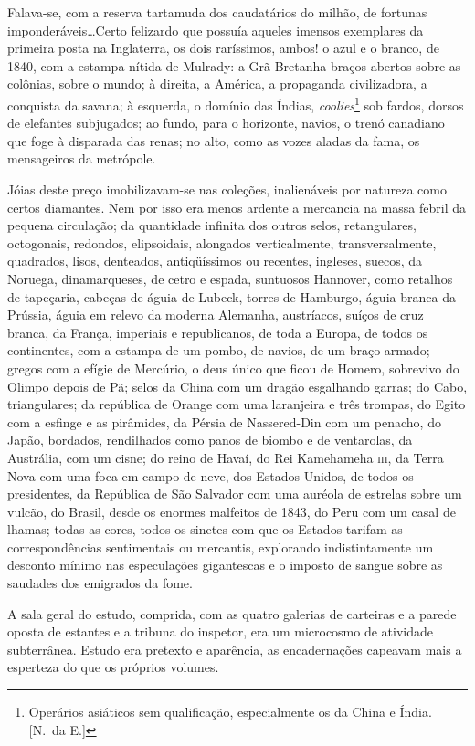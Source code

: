 Falava{}-se, com a reserva tartamuda dos caudatários do milhão, de
fortunas imponderáveis\ldots Certo felizardo que possuía aqueles imensos
exemplares da primeira posta na Inglaterra, os dois raríssimos, ambos!
o azul e o branco, de 1840, com a estampa nítida de Mulrady: a
Grã{}-Bretanha braços abertos sobre as colônias, sobre o mundo; à
direita, a América, a propaganda civilizadora, a conquista da savana; à
esquerda, o domínio das Índias, \textit{coolies}\footnote{ Operários asiáticos sem qualificação, 
especialmente os da China e Índia. [N.~da E.]} sob fardos, dorsos de elefantes
subjugados; ao fundo, para o horizonte, navios, o trenó canadiano que
foge à disparada das renas; no alto, como as vozes aladas da fama, 
os mensageiros da metrópole. 

Jóias deste preço
imobilizavam{}-se nas coleções, inalienáveis por natureza como certos
diamantes. Nem por isso era menos ardente a mercancia na massa febril
da pequena circulação; da quantidade infinita dos outros selos,
retangulares, octogonais, redondos, elipsoidais, alongados
verticalmente, transversalmente, quadrados, lisos, denteados,
antiqüíssimos ou recentes, ingleses, suecos, da Noruega, dinamarqueses,
de cetro e espada, suntuosos Hannover, como retalhos de tapeçaria,
cabeças de águia de Lubeck, torres de Hamburgo, águia branca da
Prússia, águia em relevo da moderna Alemanha, austríacos, suíços de
cruz branca, da França, imperiais e republicanos, de toda a Europa, de
todos os continentes, com a estampa de um pombo, de navios, de um braço
armado; gregos com a efígie de Mercúrio, o deus único que ficou de
Homero, sobrevivo do Olimpo depois de Pã; selos da China com um dragão
esgalhando garras; do Cabo, triangulares; da república de Orange com
uma laranjeira e três trompas, do Egito com a esfinge e as pirâmides,
da Pérsia de Nassered{}-Din com um penacho, do Japão, bordados,
rendilhados como panos de biombo e de ventarolas, da Austrália, com um
cisne; do reino de Havaí, do Rei Kamehameha \textsc{iii}, da Terra Nova com uma
foca em campo de neve, dos Estados Unidos, de todos os presidentes, da
República de São Salvador com uma auréola de estrelas sobre um vulcão,
do Brasil, desde os enormes malfeitos de 1843, do Peru com um casal de
lhamas; todas as cores, todos os sinetes com que os Estados tarifam as
correspondências sentimentais ou mercantis, explorando indistintamente
um desconto mínimo nas especulações gigantescas e o imposto de sangue
sobre as saudades dos emigrados da fome. 

A sala geral do estudo,
comprida, com as quatro galerias de carteiras e a parede oposta de
estantes e a tribuna do inspetor, era um microcosmo de atividade
subterrânea. Estudo era pretexto e aparência, as encadernações capeavam
mais a esperteza do que os próprios volumes. 

